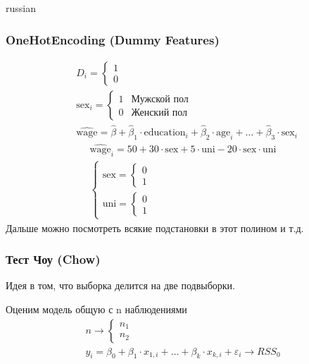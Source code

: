 \documentclass{article}
\begin{document}
\begin{otherlanguage*}{russian}
\subsubsection*{OneHotEncoding (Dummy Features)}
\begin{align*}
&D_i = \begin{cases} 
1 \\ 0 
\end{cases}  \\
&\text{sex}_i  = \begin{cases} 
1 & \text{Мужской пол} \\ 
0 & \text{Женский пол} 
\end{cases} \\
&\widehat{\text{wage}} = \hat \beta + \hat \beta_1 \cdot \text{education}_i + \hat \beta_2 \cdot \text{age}_i + \ldots + \hat \beta_3 \cdot \text{sex}_i 
\end{align*}
\begin{align*}
\widehat{\text{wage}}_i = 50 + 30 \cdot \text{sex} + 5 \cdot \text{uni} - 20 \cdot \text{sex} \cdot \text{uni} \\
\begin{cases}
\text{sex} = \begin{cases} 0 \\ 1 \end{cases} \\
\text{uni} = \begin{cases} 0 \\ 1 \end{cases}
\end{cases}
\end{align*}
Дальше можно посмотреть всякие подстановки в этот полином и т.д.
\subsubsection*{Тест Чоу (Chow)}
Идея в том, что выборка делится на две подвыборки. 

Оценим модель общую с n наблюдениями
\begin{align*}
n \rightarrow \begin{cases} n_1 \\ n_2 \end{cases} \\
y_i = \beta_0 + \beta_1 \cdot x_{1, i} + \ldots + \beta_k \cdot x_{k, i} + \varepsilon_i \rightarrow RSS_0 \\
\end{align*}


\end{otherlanguage*}
\end{document}
